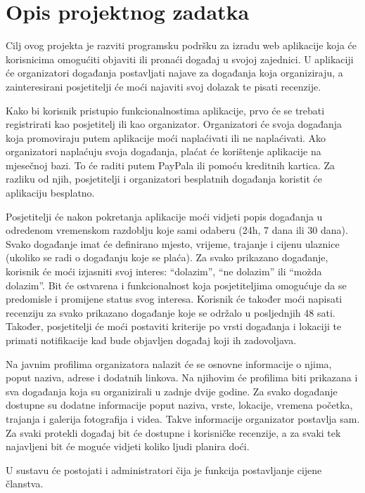 \chapter{Opis projektnog zadatka}
		
		\large Cilj ovog projekta je razviti programsku podršku za izradu web
aplikacije koja će korisnicima omogućiti objaviti ili pronaći događaj
u svojoj zajednici. U aplikaciji će organizatori događanja postavljati
najave za događanja koja organiziraju, a zainteresirani posjetitelji će
moći najaviti svoj dolazak te pisati recenzije. 

Kako bi korisnik pristupio funkcionalnostima aplikacije, prvo će se trebati registrirati kao posjetitelj ili kao organizator. Organizatori će svoja događanja koja promoviraju putem aplikacije moći naplaćivati ili ne naplaćivati. Ako organizatori naplaćuju svoja događanja, plaćat će korištenje aplikacije na mjesečnoj bazi. To će raditi putem PayPala ili pomoću kreditnih kartica. Za razliku od njih, posjetitelji i organizatori besplatnih događanja koristit će aplikaciju besplatno.

Posjetitelji će nakon pokretanja aplikacije moći vidjeti popis događanja u odredenom vremenskom razdoblju koje sami odaberu (24h, 7 dana ili 30 dana). Svako događanje imat će definirano mjesto, vrijeme, trajanje i cijenu ulaznice (ukoliko se radi o događanju koje se plaća). Za svako prikazano događanje, korisnik će moći izjasniti svoj interes: “dolazim”, “ne dolazim” ili “možda dolazim”. Bit će ostvarena i funkcionalnost koja posjetiteljima omogućuje da se predomisle i promijene status svog interesa. Korisnik će također moći napisati recenziju za svako prikazano događanje koje se održalo u posljednjih 48 sati. Također, posjetitelji će moći postaviti kriterije po vrsti događanja i lokaciji te primati notifikacije kad bude objavljen događaj koji ih zadovoljava.

	Na javnim profilima organizatora nalazit će se osnovne informacije o njima, poput naziva, adrese i dodatnih linkova. Na njihovim će profilima biti prikazana i sva događanja koja su organizirali u zadnje dvije godine. Za svako događanje dostupne su dodatne informacije poput naziva, vrste, lokacije, vremena početka, trajanja i galerija fotografija i videa. Takve informacije organizator postavlja sam. Za svaki protekli događaj bit će dostupne i korisničke recenzije, a za svaki tek najavljeni bit će moguće vidjeti koliko ljudi planira doći.
 
	U sustavu će postojati i administratori čija je funkcija postavljanje cijene članstva.


